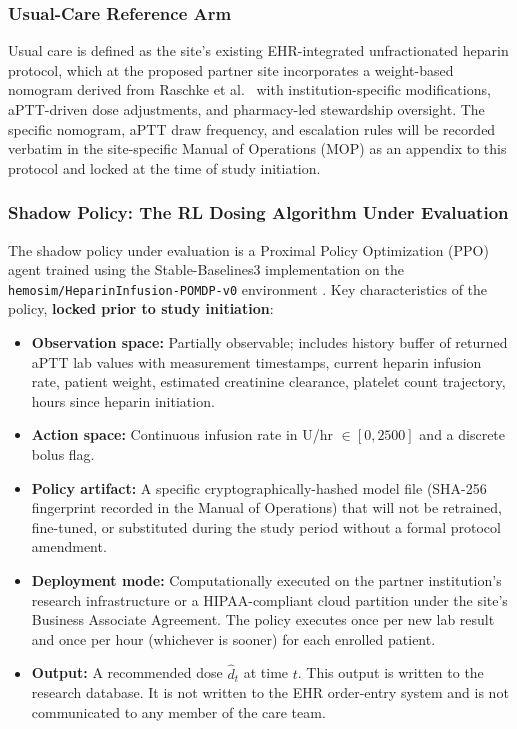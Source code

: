 \documentclass[11pt]{article}
\begin{document}
\subsubsection{Usual-Care Reference Arm}

Usual care is defined as the site's existing EHR-integrated unfractionated heparin protocol, which at the proposed partner site incorporates a weight-based nomogram derived from Raschke et al.\ \citep{raschke1993} with institution-specific modifications, aPTT-driven dose adjustments, and pharmacy-led stewardship oversight. The specific nomogram, aPTT draw frequency, and escalation rules will be recorded verbatim in the site-specific Manual of Operations (MOP) as an appendix to this protocol and locked at the time of study initiation.

\subsubsection{Shadow Policy: The RL Dosing Algorithm Under Evaluation}

The shadow policy under evaluation is a Proximal Policy Optimization (PPO) agent trained using the Stable-Baselines3 implementation on the \texttt{hemosim/HeparinInfusion-POMDP-v0} environment \citep{hemosim2026}. Key characteristics of the policy, \textbf{locked prior to study initiation}:

\begin{itemize}
  \item \textbf{Observation space:} Partially observable; includes history buffer of returned aPTT lab values with measurement timestamps, current heparin infusion rate, patient weight, estimated creatinine clearance, platelet count trajectory, hours since heparin initiation.
  \item \textbf{Action space:} Continuous infusion rate in U/hr $\in [0, 2500]$ and a discrete bolus flag.
  \item \textbf{Policy artifact:} A specific cryptographically-hashed model file (SHA-256 fingerprint recorded in the Manual of Operations) that will not be retrained, fine-tuned, or substituted during the study period without a formal protocol amendment.
  \item \textbf{Deployment mode:} Computationally executed on the partner institution's research infrastructure or a HIPAA-compliant cloud partition under the site's Business Associate Agreement. The policy executes once per new lab result and once per hour (whichever is sooner) for each enrolled patient.
  \item \textbf{Output:} A recommended dose $\hat{d}_t$ at time $t$. This output is written to the research database. It is not written to the EHR order-entry system and is not communicated to any member of the care team.
\end{itemize}
\end{document}
